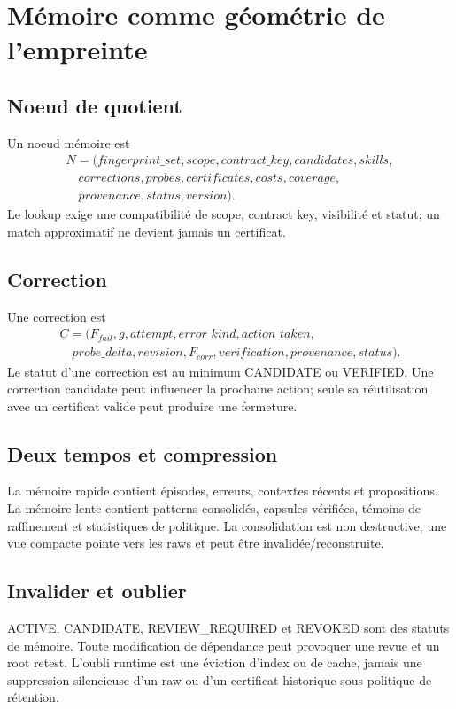 \documentclass[11pt,a4paper]{report}
\begin{document}
\chapter{Mémoire comme géométrie de l'empreinte}
\section{Noeud de quotient}
Un noeud mémoire est
\[
\begin{aligned}
N=(fingerprint\_set,scope,contract\_key,candidates,skills,\\
\quad corrections,probes,certificates,costs,coverage,\\
\quad provenance,status,version).
\end{aligned}
\]
Le lookup exige une compatibilité de scope, contract key, visibilité et statut; un match approximatif ne devient jamais un certificat.

\section{Correction}
Une correction est
\[
\begin{aligned}
C=(F_{fail},g,attempt,error\_kind,action\_taken,\\
\quad probe\_delta,revision,F_{corr},verification,provenance,status).
\end{aligned}
\]
Le statut d'une correction est au minimum CANDIDATE ou VERIFIED. Une correction candidate peut influencer la prochaine action; seule sa réutilisation avec un certificat valide peut produire une fermeture.

\section{Deux tempos et compression}
La mémoire rapide contient épisodes, erreurs, contextes récents et propositions. La mémoire lente contient patterns consolidés, capsules vérifiées, témoins de raffinement et statistiques de politique. La consolidation est non destructive; une vue compacte pointe vers les raws et peut être invalidée/reconstruite.

\section{Invalider et oublier}
ACTIVE, CANDIDATE, REVIEW\_REQUIRED et REVOKED sont des statuts de mémoire. Toute modification de dépendance peut provoquer une revue et un root retest. L'oubli runtime est une éviction d'index ou de cache, jamais une suppression silencieuse d'un raw ou d'un certificat historique sous politique de rétention.
\end{document}
